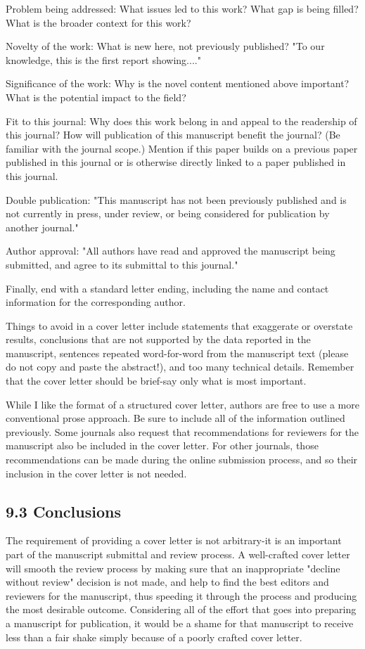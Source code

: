 Problem being addressed: What issues led to this work? What gap is being filled? What is the broader context for this work?

Novelty of the work: What is new here, not previously published? "To our knowledge, this is the first report showing...."

Significance of the work: Why is the novel content mentioned above important? What is the potential impact to the field?

Fit to this journal: Why does this work belong in and appeal to the readership of this journal? How will publication of this manuscript benefit the journal? (Be familiar with the journal scope.) Mention if this paper builds on a previous paper published in this journal or is otherwise directly linked to a paper published in this journal.

Double publication: "This manuscript has not been previously published and is not currently in press, under review, or being considered for publication by another journal."

Author approval: "All authors have read and approved the manuscript being submitted, and agree to its submittal to this journal."

Finally, end with a standard letter ending, including the name and contact information for the corresponding author.

Things to avoid in a cover letter include statements that exaggerate or overstate results, conclusions that are not supported by the data reported in the manuscript, sentences repeated word-for-word from the manuscript text (please do not copy and paste the abstract!), and too many technical details. Remember that the cover letter should be brief-say only what is most important.

While I like the format of a structured cover letter, authors are free to use a more conventional prose approach. Be sure to include all of the information outlined previously. Some journals also request that recommendations for reviewers for the manuscript also be included in the cover letter. For other journals, those recommendations can be made during the online submission process, and so their inclusion in the cover letter is not needed.

\subsection*{9.3 Conclusions}
The requirement of providing a cover letter is not arbitrary-it is an important part of the manuscript submittal and review process. A well-crafted cover letter will smooth the review process by making sure that an inappropriate "decline without review" decision is not made, and help to find the best editors and reviewers for the manuscript, thus speeding it through the process and producing the most desirable outcome. Considering all of the effort that goes into preparing a manuscript for publication, it would be a shame for that manuscript to receive less than a fair shake simply because of a poorly crafted cover letter.

